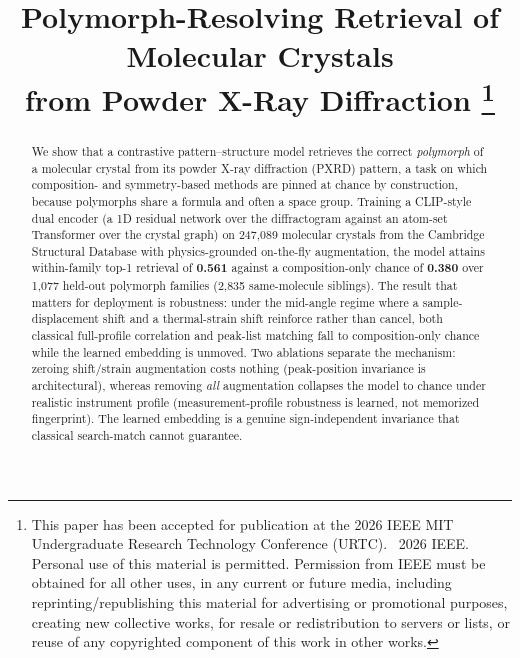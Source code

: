 \documentclass[conference]{IEEEtran}
\begin{document}
\title{Polymorph-Resolving Retrieval of Molecular Crystals\\ from Powder X-Ray Diffraction%
\thanks{This paper has been accepted for publication at the 2026 IEEE MIT
Undergraduate Research Technology Conference (URTC). \textcopyright~2026 IEEE.
Personal use of this material is permitted. Permission from IEEE must be
obtained for all other uses, in any current or future media, including
reprinting/republishing this material for advertising or promotional purposes,
creating new collective works, for resale or redistribution to servers or
lists, or reuse of any copyrighted component of this work in other works.}}

\author{
}

\maketitle

\begin{abstract}
We show that a contrastive pattern--structure model retrieves the correct
\emph{polymorph} of a molecular crystal from its powder X-ray diffraction (PXRD)
pattern, a task on which composition- and symmetry-based methods are pinned at
chance by construction, because polymorphs share a formula and often a space
group. Training a CLIP-style dual encoder (a 1D residual network over the
diffractogram against an atom-set Transformer over the crystal graph) on
247{,}089 molecular crystals from the Cambridge Structural Database with
physics-grounded on-the-fly augmentation, the model attains within-family top-1
retrieval of \textbf{0.561} against a composition-only chance of \textbf{0.380}
over 1{,}077 held-out polymorph families (2{,}835 same-molecule siblings). The
result that matters for deployment is robustness: under the mid-angle regime
where a sample-displacement shift and a thermal-strain shift reinforce rather
than cancel, both classical full-profile correlation and peak-list matching fall
to composition-only chance while the learned embedding is unmoved. Two ablations
separate the mechanism: zeroing shift/strain augmentation costs nothing
(peak-position invariance is architectural), whereas removing \emph{all}
augmentation collapses the model to chance under realistic instrument profile
(measurement-profile robustness is learned, not memorized fingerprint). The
learned embedding is a genuine sign-independent invariance that classical
search-match cannot guarantee.
\end{abstract}
\end{document}
